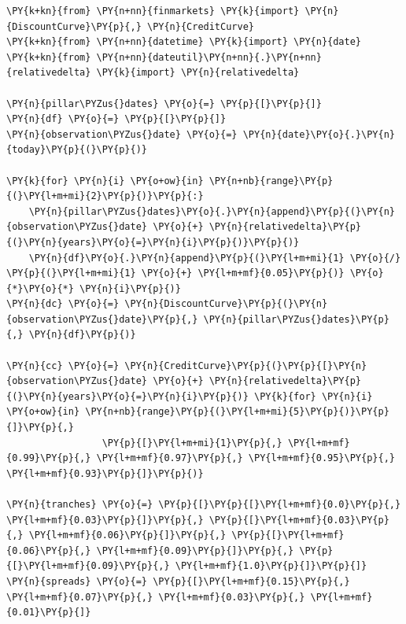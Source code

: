 \begin{tcolorbox}[breakable, size=fbox, boxrule=1pt, pad at break*=1mm,colback=cellbackground, colframe=cellborder]
\begin{Verbatim}[commandchars=\\\{\}]
\PY{k+kn}{from} \PY{n+nn}{finmarkets} \PY{k}{import} \PY{n}{DiscountCurve}\PY{p}{,} \PY{n}{CreditCurve}
\PY{k+kn}{from} \PY{n+nn}{datetime} \PY{k}{import} \PY{n}{date}
\PY{k+kn}{from} \PY{n+nn}{dateutil}\PY{n+nn}{.}\PY{n+nn}{relativedelta} \PY{k}{import} \PY{n}{relativedelta}

\PY{n}{pillar\PYZus{}dates} \PY{o}{=} \PY{p}{[}\PY{p}{]}
\PY{n}{df} \PY{o}{=} \PY{p}{[}\PY{p}{]}
\PY{n}{observation\PYZus{}date} \PY{o}{=} \PY{n}{date}\PY{o}{.}\PY{n}{today}\PY{p}{(}\PY{p}{)}
		
\PY{k}{for} \PY{n}{i} \PY{o+ow}{in} \PY{n+nb}{range}\PY{p}{(}\PY{l+m+mi}{2}\PY{p}{)}\PY{p}{:}
    \PY{n}{pillar\PYZus{}dates}\PY{o}{.}\PY{n}{append}\PY{p}{(}\PY{n}{observation\PYZus{}date} \PY{o}{+} \PY{n}{relativedelta}\PY{p}{(}\PY{n}{years}\PY{o}{=}\PY{n}{i}\PY{p}{)}\PY{p}{)}
    \PY{n}{df}\PY{o}{.}\PY{n}{append}\PY{p}{(}\PY{l+m+mi}{1} \PY{o}{/} \PY{p}{(}\PY{l+m+mi}{1} \PY{o}{+} \PY{l+m+mf}{0.05}\PY{p}{)} \PY{o}{*}\PY{o}{*} \PY{n}{i}\PY{p}{)}
\PY{n}{dc} \PY{o}{=} \PY{n}{DiscountCurve}\PY{p}{(}\PY{n}{observation\PYZus{}date}\PY{p}{,} \PY{n}{pillar\PYZus{}dates}\PY{p}{,} \PY{n}{df}\PY{p}{)}
		
\PY{n}{cc} \PY{o}{=} \PY{n}{CreditCurve}\PY{p}{(}\PY{p}{[}\PY{n}{observation\PYZus{}date} \PY{o}{+} \PY{n}{relativedelta}\PY{p}{(}\PY{n}{years}\PY{o}{=}\PY{n}{i}\PY{p}{)} \PY{k}{for} \PY{n}{i} \PY{o+ow}{in} \PY{n+nb}{range}\PY{p}{(}\PY{l+m+mi}{5}\PY{p}{)}\PY{p}{]}\PY{p}{,}
                 \PY{p}{[}\PY{l+m+mi}{1}\PY{p}{,} \PY{l+m+mf}{0.99}\PY{p}{,} \PY{l+m+mf}{0.97}\PY{p}{,} \PY{l+m+mf}{0.95}\PY{p}{,} \PY{l+m+mf}{0.93}\PY{p}{]}\PY{p}{)}
		
\PY{n}{tranches} \PY{o}{=} \PY{p}{[}\PY{p}{[}\PY{l+m+mf}{0.0}\PY{p}{,} \PY{l+m+mf}{0.03}\PY{p}{]}\PY{p}{,} \PY{p}{[}\PY{l+m+mf}{0.03}\PY{p}{,} \PY{l+m+mf}{0.06}\PY{p}{]}\PY{p}{,} \PY{p}{[}\PY{l+m+mf}{0.06}\PY{p}{,} \PY{l+m+mf}{0.09}\PY{p}{]}\PY{p}{,} \PY{p}{[}\PY{l+m+mf}{0.09}\PY{p}{,} \PY{l+m+mf}{1.0}\PY{p}{]}\PY{p}{]}
\PY{n}{spreads} \PY{o}{=} \PY{p}{[}\PY{l+m+mf}{0.15}\PY{p}{,} \PY{l+m+mf}{0.07}\PY{p}{,} \PY{l+m+mf}{0.03}\PY{p}{,} \PY{l+m+mf}{0.01}\PY{p}{]}
		

\end{Verbatim}
\end{tcolorbox}
